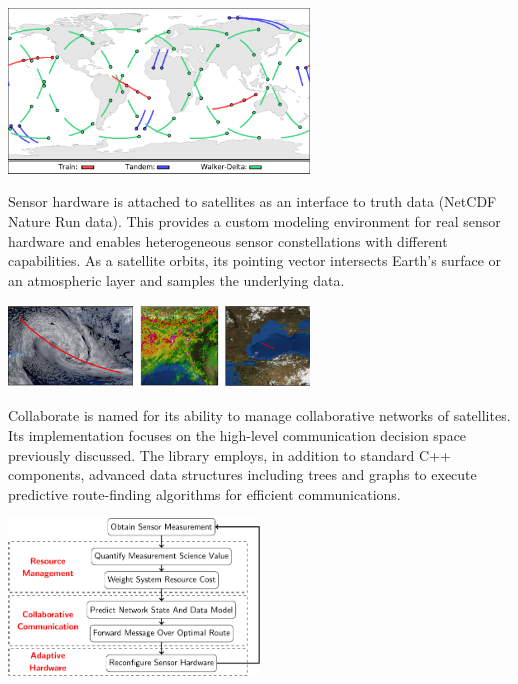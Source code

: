 \documentclass[11pt]{article}
\begin{document}
\begin{center}
\includegraphics[width=0.6\textwidth]{./images/constellations.pdf}
\end{center}

Sensor hardware is attached to satellites as an interface to truth data (NetCDF
Nature Run data).  This provides a custom modeling environment for real sensor
hardware and enables heterogeneous sensor constellations with different
capabilities.  As a satellite orbits, its pointing vector intersects Earth's
surface or an atmospheric layer and samples the underlying data.

\begin{center}
\includegraphics[width=0.6\textwidth]{./images/remote_sensing.pdf}
\end{center}

Collaborate is named for its ability to manage collaborative networks of
satellites.  Its implementation focuses on the high-level communication decision
space previously discussed.  The library employs, in addition to standard C++
components, advanced data structures including trees and graphs to execute
predictive route-finding algorithms for efficient communications.

\begin{center}
\includegraphics[width=0.5\textwidth]{./images/flowchart.pdf}
\end{center}
\end{document}
